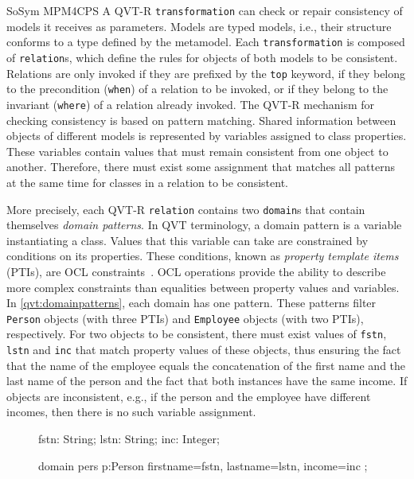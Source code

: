 \begin{copiedFrom}{SoSym MPM4CPS}
A QVT-R \texttt{transformation} can check or repair consistency of models it receives as parameters. Models are typed models, i.e., their structure conforms to a type defined by the metamodel. Each \texttt{transformation} is composed of \texttt{relation}s, which define the rules for objects of both models to be consistent. Relations are only invoked if they are prefixed by the \texttt{top} keyword, if they belong to the precondition (\texttt{when}) of a relation to be invoked, or if they belong to the invariant (\texttt{where}) of a relation already invoked. The QVT-R mechanism for checking consistency is based on pattern matching. Shared information between objects of different models is represented by variables assigned to class properties. These variables contain values that must remain consistent from one object to another. Therefore, there must exist some assignment that matches all patterns at the same time for classes in a relation to be consistent. 

More precisely, each QVT-R \texttt{relation} contains two \texttt{domain}s that contain themselves \textit{domain patterns}. In QVT terminology, a domain pattern is a variable instantiating a class. Values that this variable can take are constrained by conditions on its properties. These conditions, known as \textit{property template items} (PTIs), are OCL constraints~\cite{ocl}. OCL operations provide the ability to describe more complex constraints than equalities between property values and variables. In \autoref{qvt:domainpatterns}, each domain has one pattern. These patterns filter \texttt{Person} objects (with three PTIs) and \texttt{Employee} objects (with two PTIs), respectively. For two objects to be consistent, there must exist values of \texttt{fstn}, \texttt{lstn} and \texttt{inc} that match property values of these objects, thus ensuring the fact that the name of the employee equals the concatenation of the first name and the last name of the person and the fact that both instances have the same income. If objects are inconsistent, e.g., if the person and the employee have different incomes, then there is no such variable assignment.

\begin{figure}
\begin{embeddedqvtcode}[frame=bt, numbers=none, mathescape=true, caption={Two domains, each with one domain pattern},label={qvt:domainpatterns},captionpos=b]
fstn: String; lstn: String;
inc: Integer;

domain pers p:Person {
    firstname=fstn, lastname=lstn, 
    income=inc
};


\end{embeddedqvtcode}
\end{figure}
\end{copiedFrom}
